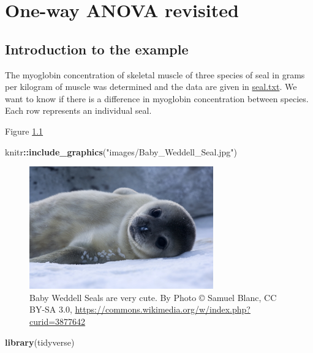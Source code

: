 \documentclass[
]{book}
\newenvironment{Shaded}{\begin{snugshade}}{\end{snugshade}}
\newcommand{\KeywordTok}[1]{\textcolor[rgb]{0.13,0.29,0.53}{\textbf{#1}}}
\newcommand{\NormalTok}[1]{#1}
\newcommand{\OperatorTok}[1]{\textcolor[rgb]{0.81,0.36,0.00}{\textbf{#1}}}
\newcommand{\StringTok}[1]{\textcolor[rgb]{0.31,0.60,0.02}{#1}}
\begin{document}
\hypertarget{one-way-anova-revisit}{%
\chapter{One-way ANOVA revisited}\label{one-way-anova-revisit}}

\hypertarget{introduction-to-the-example-2}{%
\section{Introduction to the example}\label{introduction-to-the-example-2}}

The myoglobin concentration of skeletal muscle of three species of seal in grams per kilogram of muscle was determined and the data are given in \href{data-raw/seal.text}{seal.txt}. We want to know if there is a difference in myoglobin concentration between species. Each row represents an individual seal.

Figure \ref{fig:weddell-fig}



\begin{Shaded}
\begin{Highlighting}[]
\NormalTok{knitr}\OperatorTok{::}\KeywordTok{include_graphics}\NormalTok{(}\StringTok{"images/Baby_Weddell_Seal.jpg"}\NormalTok{)}
\end{Highlighting}
\end{Shaded}

\begin{figure}

\includegraphics[width=0.8\linewidth,height=200px]{images/Baby_Weddell_Seal} \hfill{}

\caption{Baby Weddell Seals are very cute. By Photo © Samuel Blanc, CC BY-SA 3.0, \url{https://commons.wikimedia.org/w/index.php?curid=3877642}}\label{fig:weddell-fig}
\end{figure}

\begin{Shaded}
\begin{Highlighting}[]
\KeywordTok{library}\NormalTok{(tidyverse)}
\end{Highlighting}
\end{Shaded}
\end{document}
